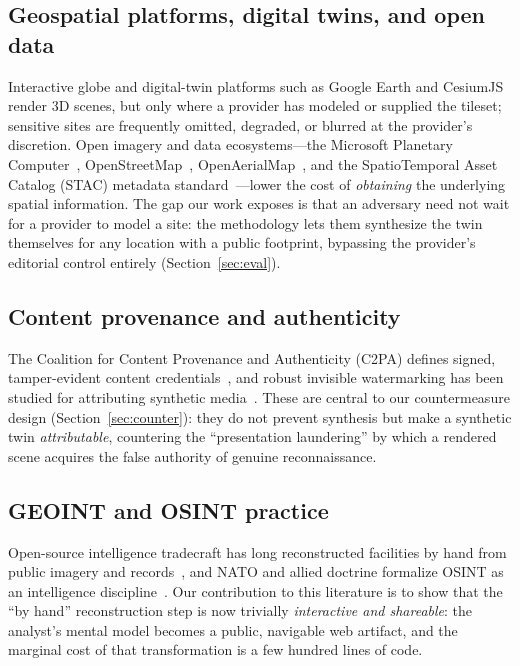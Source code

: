 \documentclass[conference]{IEEEtran}
\begin{document}
\subsection{Geospatial platforms, digital twins, and open data}
Interactive globe and digital-twin platforms such as Google Earth and
CesiumJS~\cite{cesium} render 3D scenes, but only where a provider has modeled or
supplied the tileset; sensitive sites are frequently omitted, degraded, or
blurred at the provider's discretion. Open imagery and data ecosystems---the
Microsoft Planetary Computer~\cite{planetary}, OpenStreetMap~\cite{osm},
OpenAerialMap~\cite{oam}, and the SpatioTemporal Asset Catalog (STAC)
metadata standard~\cite{stac}---lower the cost of \emph{obtaining} the underlying
spatial information. The gap our work exposes is that an adversary need not wait
for a provider to model a site: the methodology lets them synthesize the twin
themselves for any location with a public footprint, bypassing the provider's
editorial control entirely (Section~\ref{sec:eval}).

\subsection{Content provenance and authenticity}
The Coalition for Content Provenance and Authenticity (C2PA) defines signed,
tamper-evident content credentials~\cite{c2pa}, and robust invisible watermarking
has been studied for attributing synthetic media~\cite{watermark}. These are
central to our countermeasure design (Section~\ref{sec:counter}): they do not
prevent synthesis but make a synthetic twin \emph{attributable}, countering the
``presentation laundering'' by which a rendered scene acquires the false authority
of genuine reconnaissance.

\subsection{GEOINT and OSINT practice}
Open-source intelligence tradecraft has long reconstructed facilities by hand from
public imagery and records~\cite{osint}, and NATO and allied doctrine formalize
OSINT as an intelligence discipline~\cite{natoosint}. Our contribution to this
literature is to show that the ``by hand'' reconstruction step is now trivially
\emph{interactive and shareable}: the analyst's mental model becomes a public,
navigable web artifact, and the marginal cost of that transformation is a few
hundred lines of code.

\end{document}
